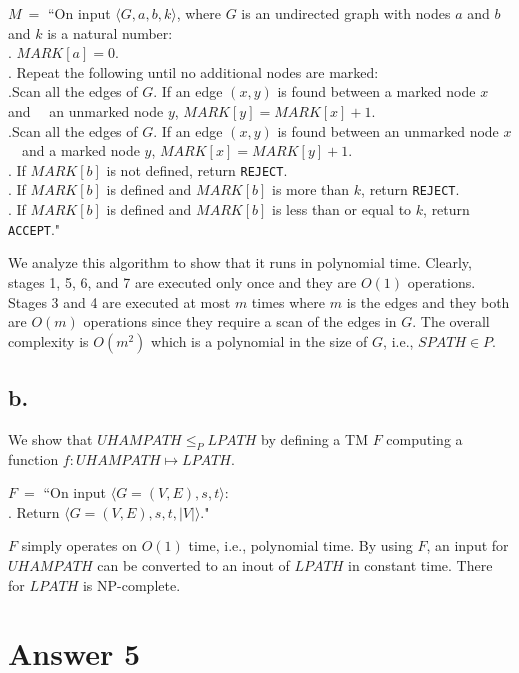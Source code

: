 \documentclass[12pt]{article}
\begin{document}
$M \ =$ ``On input $\langle G, a, b, k\rangle$, where $G$ is an undirected graph with nodes $a$ and $b$ and $k$ is a natural number:\\
	\indent{}. $MARK[a] = 0$.\\
	\indent{}. Repeat the following until no additional nodes are marked:\\
	\indent{}.\indent\indent Scan all the edges of $G$. If an edge $(x, y)$ is found between a marked node $x$ and \indent\indent\indent\indent \ \ an unmarked node $y$, $MARK[y] = MARK[x] + 1$.\\
	\indent{}.\indent\indent Scan all the edges of $G$. If an edge $(x, y)$ is found between an unmarked node $x$ \indent\indent\indent\indent \ \ and a marked node $y$, $MARK[x] = MARK[y] + 1$.\\
	\indent{}. If $MARK[b]$ is not defined, return \texttt{REJECT}.\\
	\indent{}. If $MARK[b]$ is defined and $MARK[b]$ is more than $k$, return \texttt{REJECT}.\\
	\indent{}. If $MARK[b]$ is defined and $MARK[b]$ is less than or equal to $k$, return \texttt{ACCEPT}."
	
We analyze this algorithm to show that it runs in polynomial time. Clearly, stages 1, 5, 6, and 7 are executed only once and they are $O(1)$ operations. Stages 3 and 4 are executed at most $m$ times where $m$ is the edges and they both are $O(m)$ operations since they require a scan of the edges in $G$. The overall complexity is $O(m^2)$ which is a polynomial in the size of $G$, i.e., $SPATH \in P$.

\subsection*{b.}

We show that $UHAMPATH \leq_P LPATH$ by defining a TM $F$ computing a function $f: UHAMPATH \mapsto LPATH$.

$F \ =$ ``On input $\langle G = (V, E), s, t\rangle$:\\
	\indent{}. Return $\langle G = (V, E), s, t, |V|\rangle$."

$F$ simply operates on $O(1)$ time, i.e., polynomial time. By using $F$, an input for $UHAMPATH$ can be converted to an inout of $LPATH$ in constant time. There for $LPATH$ is NP-complete.

\section*{Answer 5}
\end{document}
